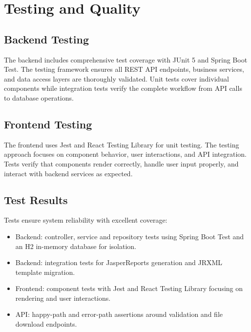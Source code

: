 \documentclass[a4paper,12pt]{report}
\begin{document}
\section{Testing and Quality}
\begin{doublespace}

\subsection{Backend Testing}
\hspace{1cm}The backend includes comprehensive test coverage with JUnit 5 and Spring Boot Test. The testing framework ensures all REST API endpoints, business services, and data access layers are thoroughly validated. Unit tests cover individual components while integration tests verify the complete workflow from API calls to database operations.

\subsection{Frontend Testing}
\hspace{1cm}The frontend uses Jest and React Testing Library for unit testing. The testing approach focuses on component behavior, user interactions, and API integration. Tests verify that components render correctly, handle user input properly, and interact with backend services as expected.

\subsection{Test Results}
\hspace{1cm}Tests ensure system reliability with excellent coverage:

\begin{itemize}
  \item Backend: controller, service and repository tests using Spring Boot Test and an H2 in-memory database for isolation.
  \item Backend: integration tests for JasperReports generation and JRXML template migration.
  \item Frontend: component tests with Jest and React Testing Library focusing on rendering and user interactions.
  \item API: happy-path and error-path assertions around validation and file download endpoints.
\end{itemize}

\end{doublespace}
\end{document}
